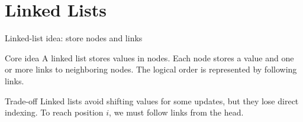 \documentclass[aspectratio=169]{beamer}
\begin{document}
\section{Linked Lists}

\begin{frame}{Linked-list idea: store nodes and links}
\small
\begin{block}{Core idea}
A linked list stores values in nodes. Each node stores a value and one or more links to neighboring nodes.
The logical order is represented by following links.
\end{block}

\begin{center}
\end{center}

\begin{exampleblock}{Trade-off}
Linked lists avoid shifting values for some updates, but they lose direct indexing.
To reach position $i$, we must follow links from the head.
\end{exampleblock}
\end{frame}
\end{document}
